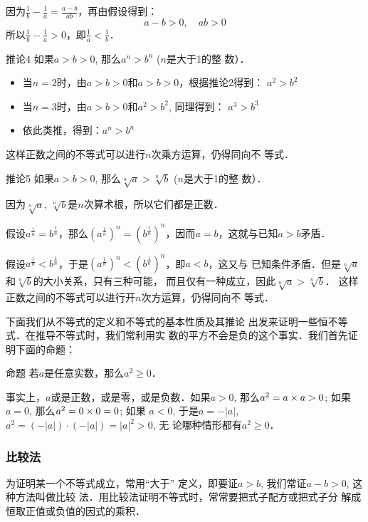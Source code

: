 因为$\frac{1}{b}-\frac{1}{a}=\frac{a-b}{ab}$，再由假设得到：
\[a-b>0,\quad ab>0\]
所以$\frac{1}{b}-\frac{1}{a}>0$，即$\frac{1}{a}<\frac{1}{b}$．

\begin{blk}{推论4}
    如果$a>b>0$, 那么$a^n>b^n$ ($n$是大于1的整
数）．
\end{blk}

\begin{itemize}
    \item 当$n=2$时，由$a>b>0$和$a>b>0$，根据推论2得到：
$a^2>b^2$
\item 当$n=3$时，由$a>b>0$和$a^2>b^2$, 同理得到：
$a^3>b^3$
\item 依此类推，得到：$a^n>b^n$
\end{itemize}
这样正数之间的不等式可以进行$n$次乘方运算，仍得同向不
等式．

\begin{blk}{推论5}
    如果$a>b>0$, 那么$\sqrt[n]{a}>\sqrt[n]{b}$ ($n$是大于1的整
数）．
\end{blk}

因为$\sqrt[n]{a}$, $\sqrt[n]{b}$是$n$次算术根，所以它们都是正数．

假设$a^{\tfrac{1}{n}}=b^{\tfrac{1}{n}}$，那么$\left(a^{\tfrac{1}{n}}\right)^n=\left(b^{\tfrac{1}{n}}\right)^n$，因而$a=b$，这就与已知$a>b$矛盾．

假设$a^{\tfrac{1}{n}}<b^{\tfrac{1}{n}}$，于是$\left(a^{\tfrac{1}{n}}\right)^n<\left(b^{\tfrac{1}{n}}\right)^n$，即$a<b$，这又与
已知条件矛盾．但是$\sqrt[n]{a}$和$\sqrt[n]{b}$的大小关系，只有三种可能，
而且仅有一种成立，因此$\sqrt[n]{a}>\sqrt[n]{b}$．
这样正数之间的不等式可以进行开$n$次方运算，仍得同向不
等式．

下面我们从不等式的定义和不等式的基本性质及其推论
出发来证明一些恒不等式．在推导不等式时，我们常利用实
数的平方不会是负的这个事实．我们首先证明下面的命题：

\begin{blk}{命题}
    若$a$是任意实数，那么$a^2\ge 0$．
\end{blk}

事实上，$a$或是正数，或是零，或是负数．如果$a>0$,
那么$a^2=a\times a>0$; 如果$a=0$, 那么$a^2=0\times0=0$; 如果
$a<0$, 于是$a=-|a|$, $a^2=(-|a|)\cdot (-|a|)=|a|^2>0$, 无
论哪种情形都有$a^2\ge 0$．

\subsubsection{比较法}

为证明某一个不等式成立，常用“大于”
定义，即要证$a>b$, 我们常证$a-b>0$, 这种方法叫做比较
法．用比较法证明不等式时，常常要把式子配方或把式子分
解成恒取正值或负值的因式的乘积．

